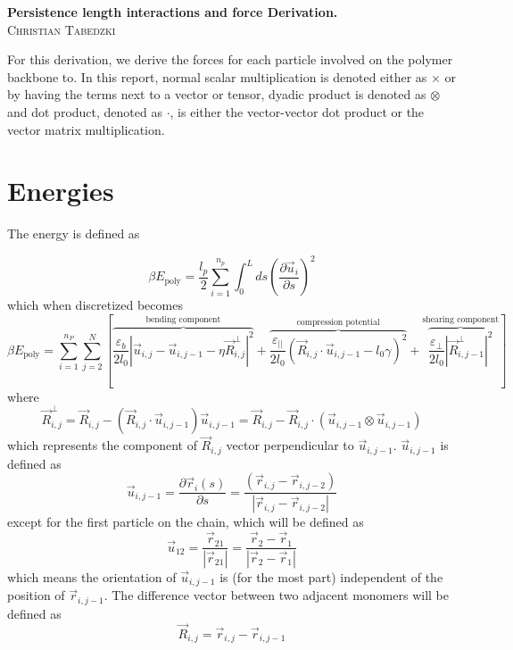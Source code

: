 \documentclass{article}
\renewcommand{\ij}{_{i,j}}
\newcommand{\ijj}{_{i,j-1}}
\newcommand{\ijk}{_{i,j-2}}
\newcommand{\magn}[1]{\left\vert #1 \right\vert }
\renewcommand{\part}[2]{\frac{\partial #1 }{\partial #2}}
\newcommand{\Rij}{\vec{R} \ij}
\newcommand{\uijj}{\vec{u} \ijj}
\begin{document}
\begin{center}
  \textbf{Persistence length interactions and force Derivation.}\\
  \textsc{Christian Tabedzki}
\end{center} 


For this derivation, we derive the forces for each particle involved on the polymer
backbone to. In this report, normal scalar multiplication is denoted either as
$\times$ or by having the terms next to a vector or tensor, dyadic product
is denoted as $\otimes$ and dot product, denoted as $\cdot$, is either the vector-vector dot product or the vector matrix multiplication.

\section{Energies}

The energy is defined as 

\begin{equation}
  \label{eqn:Energy_polymer}
  \beta E_{\text{poly}}  =  \frac{l_p}{2} \sum_{i=1}^{n_p} \int_0^L ds \left(\part{\vec{u}_i}{s}\right)^2
\end{equation}
which when discretized becomes
\begin{equation}
  \label{eqn:Energy_polymer_discrete}
  \beta E_{\text{poly}}  =  \sum_{i=1}^{n_P}  \sum_{j=2}^{N} \left[
  \overbrace{
  \frac{\varepsilon_b}{2 l_0}  \magn{ \vec{u} \ij - \vec{u} \ijj - \eta 
  \vec{R}\ij ^\bot} ^2 
  }^{\text{bending component}}
  +
\overbrace{
  \frac{\varepsilon_{\vert \vert}}{2 l_0} 
  \left( \vec{R}\ij \cdot \vec{u} \ijj - l_0 \gamma \right)^2 
  }^{\text{compression potential}}
  +
  \overbrace{
  \frac{\varepsilon _\perp}
  {2l_0} \magn{\vec{R}\ijj ^\perp}^2
  }^{\text{shearing component}}
  \right]
\end{equation}
where 
\[
\vec{R}\ij  ^\bot = \vec{R} \ij - \left(\vec{R} \ij \cdot \vec{u} \ijj \right)
\vec{u} \ijj  = \Rij - \Rij \cdot \left(
 \uijj \otimes \uijj  
\right)
\]
which represents the component of \(\vec{R} \ij\) vector perpendicular to \(\vec{u} \ijj \).
\(\vec{u} \ijj \) is defined as  
  \[
  \vec{u}_{i,j-1} = 
  \part{\vec{{}r}_i(s)}{s} = 
    \frac{\left( \vec{r}\ij-\vec{r}\ijk \right)}{\magn{\vec{r}\ij - \vec{r}\ijk}} \]
except for the first particle on the chain, which will be defined as 
\[
  \vec{u}_{12} = \frac{\vec{r}_{21}}{\magn{\vec{r}_{21}}} = 
  \frac{\vec{r}_2 - \vec{r}_1}{\magn{\vec{r}_2 - \vec{r}_1}}
\]
which means the orientation of \(\vec{u}_{i,j-1}\) is (for the most part)
independent of the position of \(\vec{r}\ijj\). The difference vector between
two adjacent monomers will be defined as  
\[\vec{R} \ij = \vec{r} \ij - \vec{r} \ijj \]
\end{document}
